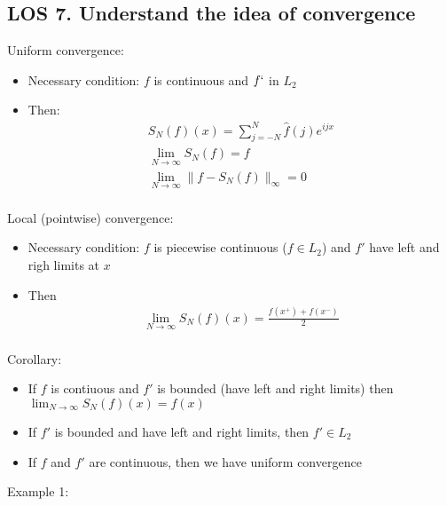 \documentclass[12pt, a4paper]{article}
\begin{document}
\subsection*{LOS 7. Understand the idea of convergence}
Uniform convergence:
\begin{itemize}
    \item Necessary condition: $f$ is continuous and $f`$ in $L_2$
    \item Then:
    \begin{gather*}
        S_N(f)(x) = \sum_{j=-N}^{N} \hat{f}(j)e^{ijx}\\
        \lim_{N\to\infty}S_N(f) = f\\
        \lim_{N\to\infty}\|f - S_N(f)\|_\infty = 0\\
    \end{gather*}
\end{itemize}
Local (pointwise) convergence:
\begin{itemize}
    \item Necessary condition: $f$ is piecewise continuous ($f \in L_2$) and $f'$ have left and righ limits at $x$
    \item Then
    \begin{gather*}
        \lim_{N\to\infty}S_N(f)(x) = \frac{f(x^+)+f(x^-)}{2}\\
    \end{gather*}
\end{itemize}
Corollary:
\begin{itemize}
    \item If $f$ is contiuous and $f'$ is bounded (have left and right limits) then $\lim_{N\to\infty} S_N(f)
(x) = f(x)$
    \item If $f'$ is bounded and have left and right limits, then $f' \in L_2$
    \item If $f$ and $f'$ are continuous, then we have uniform convergence
\end{itemize}
\vspace{0.3em}
Example 1:
\end{document}
